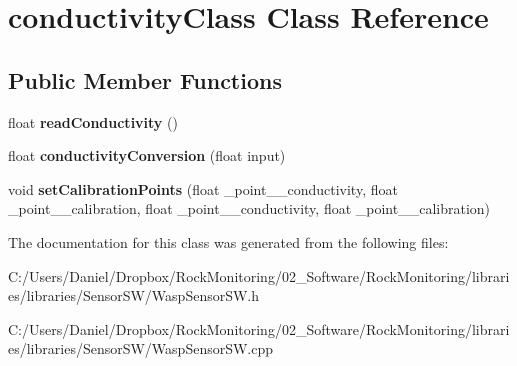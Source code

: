\hypertarget{classconductivity_class}{}\section{conductivity\+Class Class Reference}
\label{classconductivity_class}
\subsection*{Public Member Functions}
\begin{DoxyCompactItemize}
\item 
float {\bfseries read\+Conductivity} ()\hypertarget{classconductivity_class_a2ecf9287c8f19ee32dacd240dfa60213}{}\label{classconductivity_class_a2ecf9287c8f19ee32dacd240dfa60213}

\item 
float {\bfseries conductivity\+Conversion} (float input)\hypertarget{classconductivity_class_ad578635cfc4a462ac31cd846a9760aa7}{}\label{classconductivity_class_ad578635cfc4a462ac31cd846a9760aa7}

\item 
void {\bfseries set\+Calibration\+Points} (float \+\_\+point\+\_\+\_\+conductivity, float \+\_\+point\+\_\+\_\+calibration, float \+\_\+point\+\_\+\_\+conductivity, float \+\_\+point\+\_\+\_\+calibration)\hypertarget{classconductivity_class_a3921b9595e6822bd12d0dc1f57bd3a8a}{}\label{classconductivity_class_a3921b9595e6822bd12d0dc1f57bd3a8a}

\end{DoxyCompactItemize}


The documentation for this class was generated from the following files\+:\begin{DoxyCompactItemize}
\item 
C\+:/\+Users/\+Daniel/\+Dropbox/\+Rock\+Monitoring/02\+\_\+\+Software/\+Rock\+Monitoring/libraries/libraries/\+Sensor\+S\+W/Wasp\+Sensor\+S\+W.\+h\item 
C\+:/\+Users/\+Daniel/\+Dropbox/\+Rock\+Monitoring/02\+\_\+\+Software/\+Rock\+Monitoring/libraries/libraries/\+Sensor\+S\+W/Wasp\+Sensor\+S\+W.\+cpp\end{DoxyCompactItemize}
